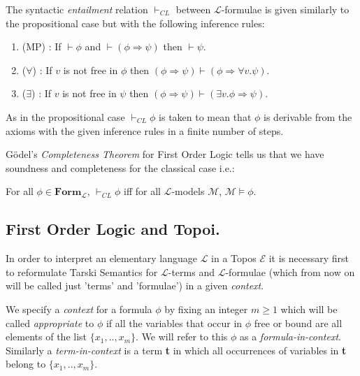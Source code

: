 The syntactic \emph{entailment} relation $\vdash_{CL}$ between $\mathcal{L}$-formulae is given similarly to the propositional case but with the following inference rules:
\begin{enumerate}
	\item (MP) : If $\vdash \phi$ and $\vdash (\phi \Rightarrow \psi)$ then $\vdash \psi$.
	\item ($\forall$) : If $v$ is not free in $\phi$ then $(\phi \Rightarrow \psi) \vdash (\phi \Rightarrow \forall v. \psi)$.
	\item ($\exists$) : If $v$ is not free in $\psi$ then $(\phi \Rightarrow \psi) \vdash (\exists v.\phi \Rightarrow \psi)$.
\end{enumerate} 
As in the propositional case $\vdash_{CL} \phi$ is taken to mean that $\phi$ is derivable from the axioms with the given inference rules in a finite number of steps.\newline

Gödel's \emph{Completeness Theorem} for First Order Logic tells us that we have soundness and completeness for the classical case i.e.:

\begin{remark}
	For all $\phi \in \mathbf{Form_\mathcal{L}}$, \newline
	$\vdash_{CL} \phi$ iff for all $\mathcal{L}$-models $\mathcal{M}$, $\mathcal{M}\vDash \phi$.
\end{remark} 



\newpage
\subsection{First Order Logic and Topoi.}

In order to interpret an elementary language $\mathcal{L}$ in a Topos $\mathcal{E}$ it is necessary first to reformulate Tarski Semantics for $\mathcal{L}$-terms and $\mathcal{L}$-formulae (which from now on will be called just 'terms' and 'formulae') in a given \emph{context}.
\begin{definition}
	We specify a \emph{context} for a formula $\phi$ by fixing an integer $m \geq 1$ which will be called \emph{appropriate} to $\phi$ if all the variables that occur in $\phi$ free or bound are all elements of the list $\{x_1,..,x_m\}$. We will refer to this $\phi$ as a \emph{formula-in-context}. \newline
	Similarly a \emph{term-in-context}  is a term \textbf{t} in which all occurrences of variables in \textbf{t} belong to $\{x_1,..,x_m\}$. 
\end{definition}

